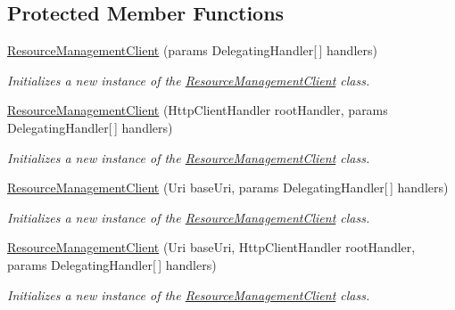 \subsection*{Protected Member Functions}
\begin{DoxyCompactItemize}
\item 
\hyperlink{class_microsoft_1_1_azure_1_1_management_1_1_resources_1_1_resource_management_client_a25717e3e6f08ff66622ecfdecaecd73f}{Resource\+Management\+Client} (params Delegating\+Handler\mbox{[}$\,$\mbox{]} handlers)
\begin{DoxyCompactList}\small\item\em Initializes a new instance of the \hyperlink{class_microsoft_1_1_azure_1_1_management_1_1_resources_1_1_resource_management_client}{Resource\+Management\+Client} class. \end{DoxyCompactList}\item 
\hyperlink{class_microsoft_1_1_azure_1_1_management_1_1_resources_1_1_resource_management_client_a29fd45246a89948d61e5ec6db8c7730b}{Resource\+Management\+Client} (Http\+Client\+Handler root\+Handler, params Delegating\+Handler\mbox{[}$\,$\mbox{]} handlers)
\begin{DoxyCompactList}\small\item\em Initializes a new instance of the \hyperlink{class_microsoft_1_1_azure_1_1_management_1_1_resources_1_1_resource_management_client}{Resource\+Management\+Client} class. \end{DoxyCompactList}\item 
\hyperlink{class_microsoft_1_1_azure_1_1_management_1_1_resources_1_1_resource_management_client_a5a5d2d72d9cd93efeac6042f182635ad}{Resource\+Management\+Client} (Uri base\+Uri, params Delegating\+Handler\mbox{[}$\,$\mbox{]} handlers)
\begin{DoxyCompactList}\small\item\em Initializes a new instance of the \hyperlink{class_microsoft_1_1_azure_1_1_management_1_1_resources_1_1_resource_management_client}{Resource\+Management\+Client} class. \end{DoxyCompactList}\item 
\hyperlink{class_microsoft_1_1_azure_1_1_management_1_1_resources_1_1_resource_management_client_a019102f4f8be6c98a0d3fd63f4d14270}{Resource\+Management\+Client} (Uri base\+Uri, Http\+Client\+Handler root\+Handler, params Delegating\+Handler\mbox{[}$\,$\mbox{]} handlers)
\begin{DoxyCompactList}\small\item\em Initializes a new instance of the \hyperlink{class_microsoft_1_1_azure_1_1_management_1_1_resources_1_1_resource_management_client}{Resource\+Management\+Client} class. \end{DoxyCompactList}\end{DoxyCompactItemize}
